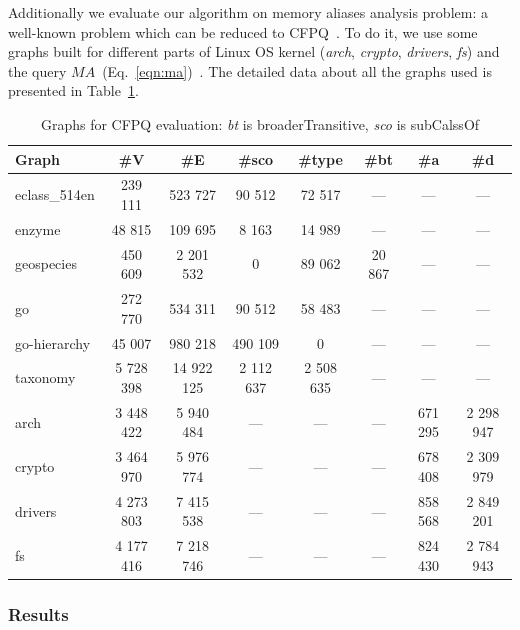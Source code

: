 Additionally we evaluate our algorithm on memory aliases analysis problem: a well-known problem which can be reduced to CFPQ~\cite{Zheng:2008:DAA:1328897.1328464}.
To do it, we use some graphs built for different parts of Linux OS kernel (\textit{arch}, \textit{crypto}, \textit{drivers}, \textit{fs}) and the query $MA$~(Eq.~\ref{eqn:ma})~\cite{10.1145/3093336.3037744}.
The detailed data about all the graphs used is presented in Table~\ref{tbl:graphs_for_cfpq}.

{\setlength{\tabcolsep}{0.2em}
\begin{table}
{
\caption{Graphs for CFPQ evaluation: \textit{bt} is broaderTransitive, \textit{sco} is subCalssOf}
\label{tbl:graphs_for_cfpq}
\scriptsize
{}
\begin{tabular}{|l|c|c|c|c|c|c|c|}
\hline
Graph          & \#V       & \#E        & \#sco & \#type &\#bt & \#a  & \#d \\
\hline
\hline
eclass\_514en  & 239 111    & 523 727    & 90 512    & 72 517    &        ---        & ---  & --- \\
enzyme         & 48 815     & 109 695    & 8 163     & 14 989    &        ---        & ---  & --- \\
geospecies     & 450 609    & 2 201 532  & 0         & 89 062    &        20 867     & ---  & --- \\
go             & 272 770    & 534 311    & 90 512    & 58 483    &        ---        & ---  & --- \\
go-hierarchy   & 45 007     & 980 218    & 490 109   & 0         &        ---        & ---  & --- \\
taxonomy       & 5 728 398  & 14 922 125 & 2 112 637 & 2 508 635 &        ---        & ---  & --- \\
\hline
arch           & 3 448 422  & 5 940 484  &      ---     &  ---   &        ---        & 671 295 & 2 298 947 \\
crypto         & 3 464 970  & 5 976 774  &      ---     &  ---   &        ---        & 678 408 & 2 309 979 \\
drivers        & 4 273 803  & 7 415 538  &      ---     &  ---   &        ---        & 858 568 & 2 849 201 \\
fs             & 4 177 416  & 7 218 746  &      ---     &  ---   &        ---        & 824 430 & 2 784 943 \\
\hline
\end{tabular}
}
\end{table}
}
\subsubsection{Results}

